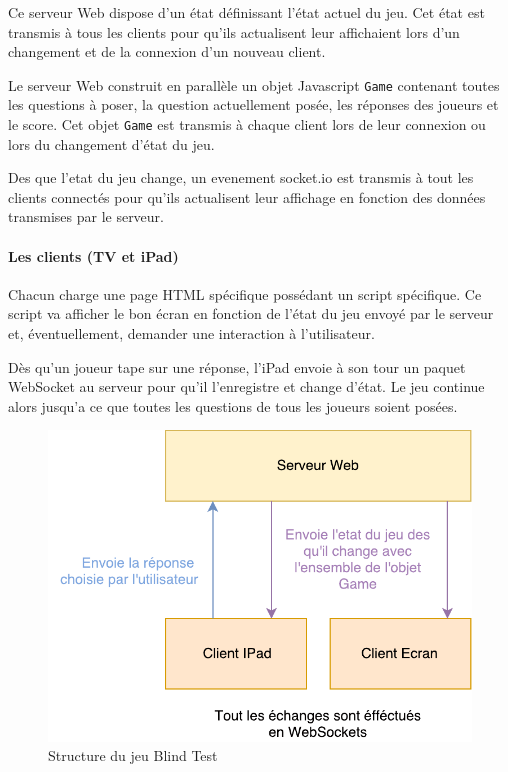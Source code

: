 Ce serveur Web dispose d'un état définissant l'état actuel du jeu.
Cet état est transmis à tous les clients pour qu'ils actualisent leur affichaient lors d'un changement et de la connexion d'un nouveau client.

Le serveur Web construit en parallèle un objet Javascript \texttt{Game} contenant toutes les questions à poser, la question actuellement posée, les réponses des joueurs et le score.
Cet objet \texttt{Game} est transmis à chaque client lors de leur connexion ou lors du changement d'état du jeu.

Des que l'etat du jeu change, un evenement socket.io est transmis à tout les clients connectés pour qu'ils actualisent leur affichage en fonction des données transmises par le serveur.

\paragraph{Les clients (TV et iPad)} Chacun charge une page HTML spécifique possédant un script spécifique.
Ce script va afficher le bon écran en fonction de l'état du jeu envoyé par le serveur et, éventuellement, demander une interaction à l'utilisateur.

Dès qu'un joueur tape sur une réponse, l'iPad envoie à son tour un paquet WebSocket au serveur pour qu'il l'enregistre et change d'état.
Le jeu continue alors jusqu'a ce que toutes les questions de tous les joueurs soient posées.

\begin{figure}[h]
    \centering
    \includegraphics{img/ah-blindtest.pdf}
    \caption{Structure du jeu Blind Test}
\end{figure}

